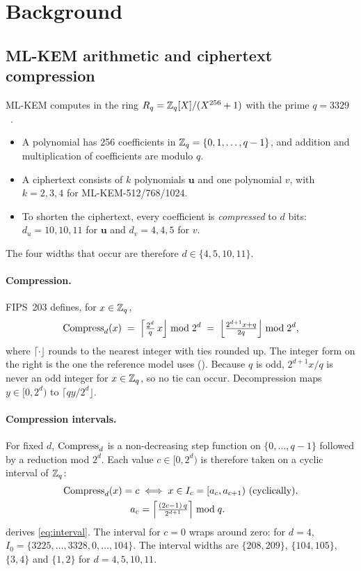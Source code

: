 \section{Background}\label{sec:background}

\subsection{ML-KEM arithmetic and ciphertext compression}\label{sec:mlkem}
ML-KEM computes in the ring $R_q = \mathbb{Z}_q[X]/(X^{256}+1)$ with the prime $q = 3329$~\cite{fips203}.
\begin{itemize}
  \item A polynomial has 256 coefficients in $\mathbb{Z}_q = \{0, 1, \dots, q-1\}$, and addition and multiplication of coefficients are modulo $q$.
  \item A ciphertext consists of $k$ polynomials $\mathbf u$ and one polynomial $v$, with $k = 2, 3, 4$ for ML-KEM-512/768/1024.
  \item To shorten the ciphertext, every coefficient is \emph{compressed} to $d$ bits: $d_u = 10, 10, 11$ for $\mathbf u$ and $d_v = 4, 4, 5$ for $v$.
\end{itemize}

The four widths that occur are therefore $d \in \{4, 5, 10, 11\}$.

\paragraph{Compression.} FIPS~203 defines, for $x \in \mathbb{Z}_q$,
\begin{equation}\label{eq:compress}
  \operatorname{Compress}_d(x) \;=\; \Bigl\lceil \tfrac{2^d}{q}\, x \Bigr\rfloor \bmod 2^d
  \;=\; \Bigl\lfloor \tfrac{2^{d+1} x + q}{2q} \Bigr\rfloor \bmod 2^d ,
\end{equation}
where $\lceil\cdot\rfloor$ rounds to the nearest integer with ties rounded up. The integer form on the right is the one the reference model uses (). Because $q$ is odd, $2^{d+1}x/q$ is never an odd integer for $x \in \mathbb{Z}_q$, so no tie can occur. Decompression maps $y \in [0, 2^d)$ to $\lceil q y / 2^d \rfloor$.

\paragraph{Compression intervals.} For fixed $d$, $\operatorname{Compress}_d$ is a non-decreasing step function on $\{0, \dots, q-1\}$ followed by a reduction mod $2^d$. Each value $c \in [0, 2^d)$ is therefore taken on a cyclic interval of $\mathbb{Z}_q$:
\begin{equation}\label{eq:interval}
\begin{aligned}
  \Comp(x) = c &\iff x \in I_c = [a_c, a_{c+1}) \ \text{(cyclically)},\\
  a_c &= \Bigl\lceil \tfrac{(2c-1)\,q}{2^{d+1}} \Bigr\rceil \bmod q .
\end{aligned}
\end{equation}
 derives \cref{eq:interval}. The interval for $c = 0$ wraps around zero: for $d = 4$, $I_0 = \{3225, \dots, 3328, 0, \dots, 104\}$. The interval widths are $\{208, 209\}$, $\{104, 105\}$, $\{3, 4\}$ and $\{1, 2\}$ for $d = 4, 5, 10, 11$.


